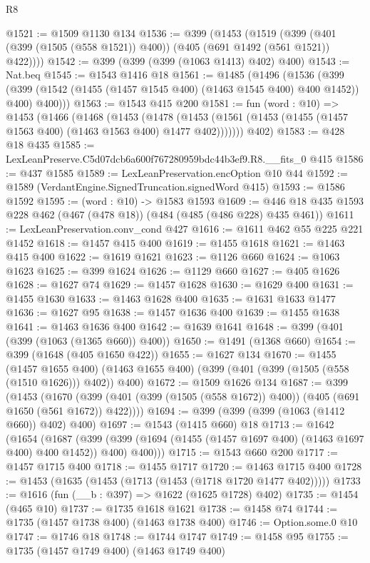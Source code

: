 \begin{lexlean}{R8}
\begin{coremodule}
@1521 := @1509 @1130 @134
@1536 := @399
    (@1453
      (@1519 (@399 (@401 (@399 (@1505 (@558 @1521)) @400)) (@405 (@691 @1492 (@561 @1521)) @422))))
@1542 := @399 (@399 (@399 (@1063 @1413) @402) @400)
@1543 := Nat.beq
@1545 := @1543 @1416 @18
@1561 := @1485
    (@1496
      (@1536
        (@399 (@399 (@1542 (@1455 (@1457 @1545 @400) (@1463 @1545 @400) @400 @1452)) @400) @400)))
@1563 := @1543 @415 @200
@1581 := fun (word : @10) =>
  @1453
    (@1466
      (@1468
        (@1453
          (@1478 (@1453 (@1561 (@1453 (@1455 (@1457 @1563 @400) (@1463 @1563 @400) @1477 @402)))))))
      @402)
@1583 := @428 @18 @435
@1585 := LexLeanPreserve.C5d07dcb6a600f767280959bdc44b3ef9.R8.__fits_0 @415
@1586 := @437 @1585
@1589 := LexLeanPreservation.encOption @10 @44
@1592 := @1589 (VerdantEngine.SignedTruncation.signedWord @415)
@1593 := @1586 @1592
@1595 := (word : @10) -> @1583 @1593
@1609 := @446 @18 @435 @1593 @228 @462 (@467 (@478 @18)) (@484 (@485 (@486 @228) @435 @461))
@1611 := LexLeanPreservation.conv_cond @427
@1616 := @1611 @462 @55 @225 @221 @1452
@1618 := @1457 @415 @400
@1619 := @1455 @1618
@1621 := @1463 @415 @400
@1622 := @1619 @1621
@1623 := @1126 @660
@1624 := @1063 @1623
@1625 := @399 @1624
@1626 := @1129 @660
@1627 := @405 @1626
@1628 := @1627 @74
@1629 := @1457 @1628
@1630 := @1629 @400
@1631 := @1455 @1630
@1633 := @1463 @1628 @400
@1635 := @1631 @1633 @1477
@1636 := @1627 @95
@1638 := @1457 @1636 @400
@1639 := @1455 @1638
@1641 := @1463 @1636 @400
@1642 := @1639 @1641
@1648 := @399 (@401 (@399 (@1063 (@1365 @660)) @400))
@1650 := @1491 (@1368 @660)
@1654 := @399 (@1648 (@405 @1650 @422))
@1655 := @1627 @134
@1670 := @1455
    (@1457 @1655 @400)
    (@1463 @1655 @400)
    (@399 (@401 (@399 (@1505 (@558 (@1510 @1626))) @402)) @400)
@1672 := @1509 @1626 @134
@1687 := @399
    (@1453
      (@1670 (@399 (@401 (@399 (@1505 (@558 @1672)) @400)) (@405 (@691 @1650 (@561 @1672)) @422))))
@1694 := @399 (@399 (@399 (@1063 (@1412 @660)) @402) @400)
@1697 := @1543 (@1415 @660) @18
@1713 := @1642
    (@1654
      (@1687
        (@399 (@399 (@1694 (@1455 (@1457 @1697 @400) (@1463 @1697 @400) @400 @1452)) @400) @400)))
@1715 := @1543 @660 @200
@1717 := @1457 @1715 @400
@1718 := @1455 @1717
@1720 := @1463 @1715 @400
@1728 := @1453 (@1635 (@1453 (@1713 (@1453 (@1718 @1720 @1477 @402)))))
@1733 := @1616 (fun (__b : @397) => @1622 (@1625 @1728) @402)
@1735 := @1454 (@465 @10)
@1737 := @1735 @1618 @1621
@1738 := @1458 @74
@1744 := @1735 (@1457 @1738 @400) (@1463 @1738 @400)
@1746 := Option.some.{0} @10
@1747 := @1746 @18
@1748 := @1744 @1747
@1749 := @1458 @95
@1755 := @1735 (@1457 @1749 @400) (@1463 @1749 @400)

\end{coremodule}
\end{lexlean}
